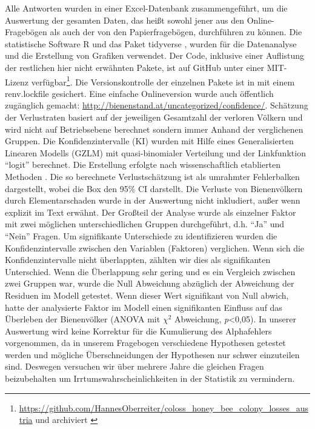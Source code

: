 Alle Antworten wurden in einer Excel-Datenbank zusammengeführt, um die Auswertung der gesamten Daten, das heißt sowohl jener aus den Online-Fragebögen als auch der von den Papierfragebögen, durchführen zu können. Die statistische Software R \citep{rcoreteam2020} und das Paket tidyverse \citep{wickham2019}, wurden für die Datenanalyse und die Erstellung von Grafiken verwendet. Der Code, inklusive einer Auflistung der restlichen hier nicht erwähnten Pakete, ist auf GitHub unter einer MIT-Lizenz verfügbar\footnote{\url{https://github.com/HannesOberreiter/coloss_honey_bee_colony_losses_austria} und archiviert \cite{HannesOberreiter2019}}. Die Versionskontrolle der einzelnen Pakete ist in mit einem renv.lockfile gesichert. Eine einfache Onlineversion wurde auch öffentlich zugänglich gemacht: \url{http://bienenstand.at/uncategorized/confidence/}.
\newline
Schätzung der Verlustraten basiert auf der jeweiligen Gesamtzahl der verloren Völkern und wird nicht auf Betriebsebene berechnet sondern immer Anhand der verglichenen Gruppen. Die Konfidenzintervalle (KI) wurden mit Hilfe eines Generalisierten Linearen Modells (GZLM) mit quasi-binomialer Verteilung und der Linkfunktion \enquote{logit} berechnet. Die Erstellung erfolgte nach wissenschaftlich etablierten Methoden \citep{vanderzee2013}. Die so berechnete Verlustschätzung ist als umrahmter Fehlerbalken dargestellt, wobei die Box den 95\% CI darstellt. Die Verluste von Bienenvölkern durch Elementarschaden wurde in der Auswertung nicht inkludiert, außer wenn explizit im Text erwähnt.
\newline
Der Großteil der Analyse wurde als einzelner Faktor mit zwei möglichen unterschiedlichen Gruppen durchgeführt, d.h. \enquote{Ja} und \enquote{Nein} Fragen. Um signifikante Unterschiede zu identifizieren wurden die Konfidenzintervalle zwischen den Variablen (Faktoren) verglichen. Wenn sich die Konfidenzintervalle nicht überlappten, zählten wir dies als signifikanten Unterschied. Wenn die Überlappung sehr gering und es ein Vergleich zwischen zwei Gruppen war, wurde die Null Abweichung abzüglich der Abweichung der Residuen im Modell getestet. Wenn dieser Wert signifikant von Null abwich, hatte der analysierte Faktor im Modell einen signifikanten Einfluss auf das Überleben der Bienenvölker (ANOVA mit $\chi^{2}$ Abweichung, \textit{p}<0,05).
\newline
In unserer Auswertung wird keine Korrektur für die Kumulierung des Alphafehlers vorgenommen, da in unserem Fragebogen verschiedene Hypothesen getestet werden und mögliche Überschneidungen der Hypothesen nur schwer einzuteilen sind. Deswegen versuchen wir über mehrere Jahre die gleichen Fragen beizubehalten um Irrtumswahrscheinlichkeiten in der Statistik zu vermindern.
